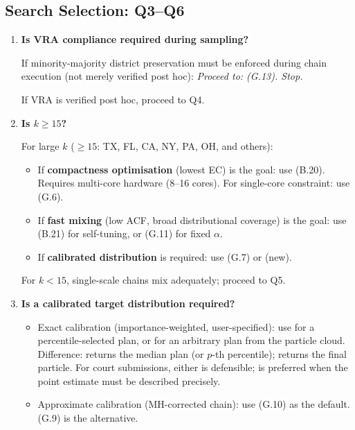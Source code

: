 \subsection{Search Selection: Q3--Q6}

\begin{enumerate}[label=\textbf{Q\arabic*.},start=3]

  \item \textbf{Is VRA compliance required during sampling?}

        If minority-majority district preservation must be enforced during
        chain execution (not merely verified post hoc):
        \emph{Proceed to: \vra{} (G.13). Stop.}

        If VRA is verified post hoc, proceed to Q4.

  \item \textbf{Is $k \geq 15$?}

        For large $k$ ($\geq 15$: TX, FL, CA, NY, PA, OH, and others):

        \begin{itemize}
          \item If \textbf{compactness optimisation} (lowest EC) is the goal:
                use \pt{} (B.20). Requires multi-core hardware (8--16 cores).
                For single-core constraint: use \sburst{} (G.6).
          \item If \textbf{fast mixing} (low ACF, broad distributional
                coverage) is the goal: use \ams{} (B.21) for self-tuning, or
                \ms{} (G.11) for fixed $\alpha$.
          \item If \textbf{calibrated distribution} is required: use \smc{}
                (G.7) or \smcp{} (new).
        \end{itemize}

        For $k < 15$, single-scale chains mix adequately; proceed to Q5.

  \item \textbf{Is a calibrated target distribution required?}

        \begin{itemize}
          \item Exact calibration (importance-weighted, user-specified):
                use \smcp{} for a percentile-selected plan, or \smc{} for
                an arbitrary plan from the particle cloud.
                Difference: \smcp{} returns the median plan (or $p$-th
                percentile); \smc{} returns the final particle.
                For court submissions, either is defensible; \smcp{} is
                preferred when the point estimate must be described precisely.
          \item Approximate calibration (MH-corrected chain): use \msp{}
                (G.10) as the default. \fr{} (G.9) is the alternative.
        \end{itemize}


\end{enumerate}
